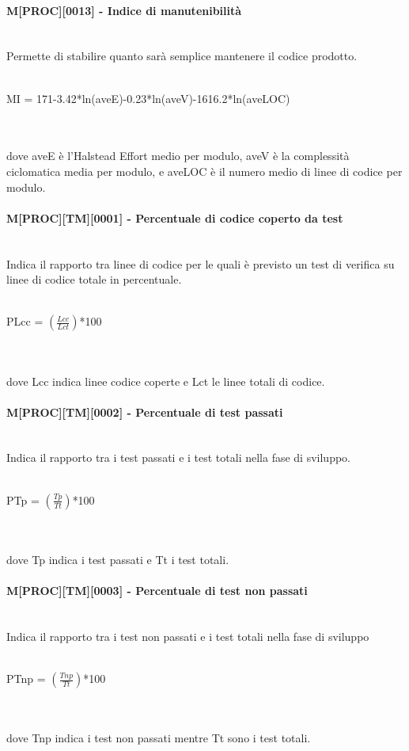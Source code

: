 \paragraph{M[PROC][0013] - Indice di manutenibilità}
~\\Permette di stabilire quanto sarà semplice mantenere il codice prodotto.
\\\\
\centerline{MI = 171-3.42*ln(aveE)-0.23*ln(aveV)-1616.2*ln(aveLOC)}
\\\\dove aveE è l'Halstead Effort medio per modulo, aveV è la complessità ciclomatica media per modulo, e aveLOC è il numero medio di linee di codice per modulo.

\paragraph{M[PROC][TM][0001] - Percentuale di codice coperto da test}
~\\Indica il rapporto tra linee di codice per le quali è previsto un test di verifica su linee di codice totale in percentuale.
\\\\
\centerline{PLcc = ${\displaystyle({\frac {Lcc}{Lct}})}$*100}
\\\\dove Lcc indica linee codice coperte e Lct le linee totali di codice.

\paragraph{M[PROC][TM][0002] - Percentuale di test passati}
~\\Indica il rapporto tra i test passati e i test totali nella fase di sviluppo.
\\\\
\centerline{PTp = ${\displaystyle({\frac {Tp}{Tt}})}$*100}
\\\\dove Tp indica i test passati e Tt i test totali.

\paragraph{M[PROC][TM][0003] - Percentuale di test non passati}
~\\Indica il rapporto tra i test non passati e i test totali nella fase di sviluppo
\\\\
\centerline{PTnp = ${\displaystyle({\frac {Tnp}{Tt}})}$*100}
\\\\dove Tnp indica i test non passati mentre Tt sono i test totali.

